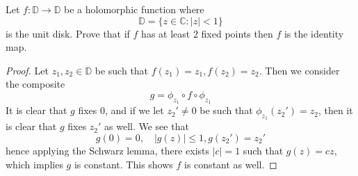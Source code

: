 \documentclass[openany]{book}
\newcommand{\D}{\mathbb{D}}
\begin{document}
\begin{prob}[Spring 2016, Q5]
Let $f:\D\to \D$ be a holomorphic function where
\[
\D=\{z\in\mathbb{C}:|z|<1\}
\]
is the unit disk. Prove that if $f$ has at least $2$ fixed points then $f$ is the identity map.
\end{prob}

\begin{proof}
    Let $z_1,z_2\in\D$ be such that $f(z_1)=z_1, f(z_2)=z_2$. Then we consider the composite 
    \begin{equation*}
        g=\phi_{z_1}\circ f\circ\phi_{z_1}
    \end{equation*}
    It is clear that $g$ fixes $0$, and if we let $z_2'\neq 0$ be such that $\phi_{z_1}(z_2')=z_2$, then it is clear that $g$ fixes $z_2'$ as well. We see that 
    \begin{equation*}
        g(0)=0, \quad |g(z)|\leq 1, g(z_2')=z_2'
    \end{equation*}
    hence applying the Schwarz lemma, there exists $|c|=1$ such that $g(z)=cz$, which implies $g$ is constant. This shows $f$ is constant as well.
\end{proof}
\end{document}
